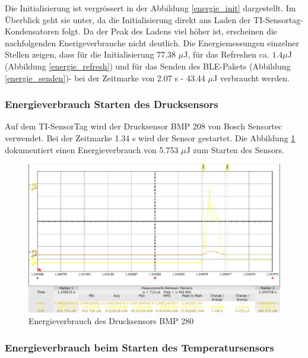 \clearpage

Die Initialisierung ist vergrössert in der Abbildung  \ref{energie_init} dargestellt. Im Überblick geht sie unter, da die Initialisierung direkt ans Laden der TI-Sensortag-Kondensatoren folgt. Da der Peak des Ladens viel höher ist, erscheinen die nachfolgenden Enerigeverbrauche nicht deutlich. Die Energiemessungen einzelner Stellen zeigen, dass für die Initialisierung 77.38 $\mu$J, für das Refreshen ca. $1.4\mu$J (Abbildung \ref{energie_refresh}) und für das Senden des BLE-Pakets (Abbildung \ref{energie_senden})- bei der Zeitmarke von 2.07 s - 43.44 $\mu$J verbraucht werden.


\subsubsection*{Energieverbrauch Starten des Drucksensors}

Auf dem TI-SensorTag wird der Drucksensor BMP 208 von Bosch Sensortec verwendet. Bei der Zeitmarke 1.34 s wird der Sensor gestartet. Die Abbildung \ref{energie_drucksensor} dokumentiert einen Energieverbrauch von 5.753 $\mu$J zum Starten des Sensors.

\begin{figure}[ht]
  \includegraphics[width=1.0\textwidth]{3Vorgehen/imag/Drucksensor.png}
  \caption{Energieverbrauch des Drucksensors BMP 280}
  \label{energie_drucksensor}
\end{figure}

\clearpage

\subsubsection*{Energieverbrauch beim Starten des Temperatursensors}

